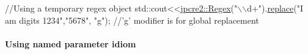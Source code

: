 \begin{DoxyCode}
\textcolor{comment}{//Using a temporary regex object}
std::cout<<\hyperlink{classjpcre2_1_1Regex}{jpcre2::Regex}(\textcolor{stringliteral}{"\(\backslash\)\(\backslash\)d+"}).\hyperlink{classjpcre2_1_1Regex_ac592ce7a5e4210ed5f90a0105b1f2981}{replace}(\textcolor{stringliteral}{"I am digits 1234"},\textcolor{stringliteral}{"5678"}, \textcolor{stringliteral}{"g"});
\textcolor{comment}{//'g' modifier is for global replacement}
\end{DoxyCode}
\hypertarget{index_replace-with-named-parameter}{}\paragraph{Using named parameter idiom}\label{index_replace-with-named-parameter}

